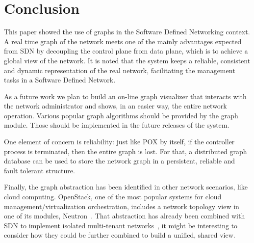 \section{Conclusion}
\label{sec:conclusion}
This paper showed the use of graphs in the Software Defined Networking context.
A real time graph of the network meets one of the mainly advantages
expected from SDN by
decoupling the control plane from data plane, which is to 
achieve a global view of the network.
It is noted that the system keeps a reliable, consistent and 
dynamic representation of the real network, facilitating the management
tasks in a Software Defined Network.

As a future work we plan to build an on-line graph visualizer 
that interacts with the network administrator and shows, in 
an easier way, the entire network operation.
Various popular graph algorithms should be provided by the graph module. 
Those should be implemented in the future releases of the system.

One element of concern is reliability:
just like POX by itself, if the controller process is terminated, then the
entire graph is lost.
For that, a distributed graph database can be used to store
the network graph in a persistent, reliable and fault tolerant
structure.

Finally, the graph abstraction has been identified in other network
scenarios, like cloud computing. OpenStack, one of the most popular systems
for cloud management/virtualization orchestration, includes a network
topology view in one of its modules, Neutron~\cite{openstacksite}. That
abstraction has already been combined with SDN to implement isolated
multi-tenant networks~\cite{lcn2013}, it might be interesting to consider
how they could be further combined to build a unified, shared view.
